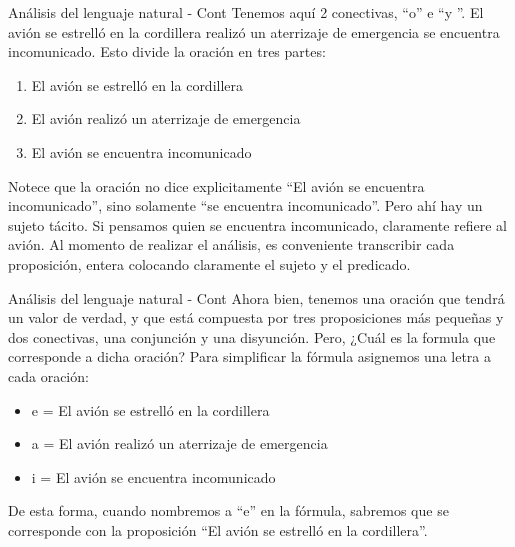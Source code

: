
\begin{frame}{Análisis del lenguaje natural - Cont}
  Tenemos aquí 2 conectivas, ``o'' e ``y ''.
  \jump
  El avión se estrelló en la cordillera  realizó un aterrizaje de
  emergencia  se encuentra incomunicado.
  \jump
  Esto divide la oración en tres partes:
  \begin{enumerate}
    \item El avión se estrelló en la cordillera
    \item El avión realizó un aterrizaje de emergencia
    \item El avión se encuentra incomunicado
  \end{enumerate}
  \jump
  \small{Notece que la oración no dice explicitamente ``El avión se encuentra incomunicado'',
  sino solamente ``se encuentra incomunicado''. Pero ahí hay un sujeto tácito.
  Si pensamos quien se encuentra incomunicado, claramente refiere al avión.
  \jump
  Al momento de realizar el análisis, es conveniente transcribir cada proposición,
  entera colocando claramente el sujeto y el predicado.
  }
\end{frame}


\begin{frame}{Análisis del lenguaje natural - Cont}
  Ahora bien, tenemos una oración que tendrá un valor de verdad, y que está
  compuesta por tres proposiciones más pequeñas y dos conectivas, una conjunción
  y una disyunción.
  \jump
  Pero, ¿Cuál es la formula que corresponde a dicha oración?
  \jump
  Para simplificar la fórmula asignemos una letra a cada oración:
  \begin{itemize}
    \item e = El avión se estrelló en la cordillera
    \item a = El avión realizó un aterrizaje de emergencia
    \item i = El avión se encuentra incomunicado
  \end{itemize}
  \jump
  De esta forma, cuando nombremos a ``e'' en la fórmula, sabremos que se
  corresponde con la proposición ``El avión se estrelló en la cordillera''.
\end{frame}


